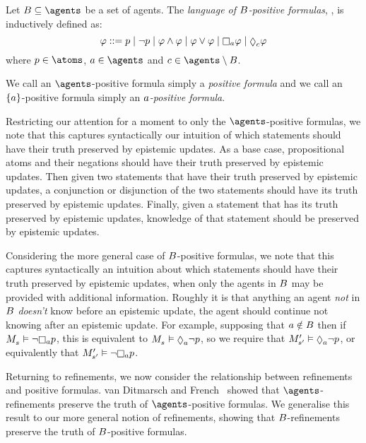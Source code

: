 \begin{definition}
Let $\agentsB \subseteq \agents$ be a set of agents.
The {\em language of $B$-positive formulas}, \langMlPlusBs{}, is inductively defined as:
$$
\phi ::= 
    \atomP \mid
    \lnot \atomP \mid
    \phi \land \phi \mid
    \phi \lor \phi \mid
    \necessaryA \phi \mid
    \possibleC \phi
$$
where $\atomP \in \atoms$, $\agentA \in \agents$ and $\agentC \in \agents \setminus \agentsB$.
\end{definition}

We call an $\agents$-positive formula simply a {\em positive formula} and we call an $\{a\}$-positive formula simply an {\em $a$-positive formula}.

Restricting our attention for a moment to only the $\agents$-positive formulas, we note that this captures syntactically our intuition of which statements should have their truth preserved by epistemic updates.
As a base case, propositional atoms and their negations should have their truth preserved by epistemic updates.
Then given two statements that have their truth preserved by epistemic updates, a conjunction or disjunction of the two statements should have its truth preserved by epistemic updates.
Finally, given a statement that has its truth preserved by epistemic updates, knowledge of that statement should be preserved by epistemic updates. 

Considering the more general case of $B$-positive formulas, we note that this captures syntactically an intuition about which statements should have their truth preserved by epistemic updates, when only the agents in $B$ may be provided with additional information.
Roughly it is that anything an agent {\em not} in $B$ {\em doesn't} know before an epistemic update, the agent should continue not knowing after an epistemic update.
For example, supposing that $a \notin B$ then if $\kPModel{\kStateS} \entails \lnot \knowsA \atomP$, this is equivalent to $\kPModel{\kStateS} \entails \possibleA \lnot \atomP$, so we require that $\kPModelP{\kStateSP} \entails \possibleA \lnot \atomP$, or equivalently that $\kPModelP{\kStateSP} \entails \lnot \knowsA \atomP$.

Returning to refinements, we now consider the relationship between refinements and positive formulas.
van Ditmarsch and French~\cite{vanditmarsch:2009} showed that $\agents$-refinements preserve the truth of $\agents$-positive formulas.
We generalise this result to our more general notion of refinements, showing that $B$-refinements preserve the truth of $B$-positive formulas.

